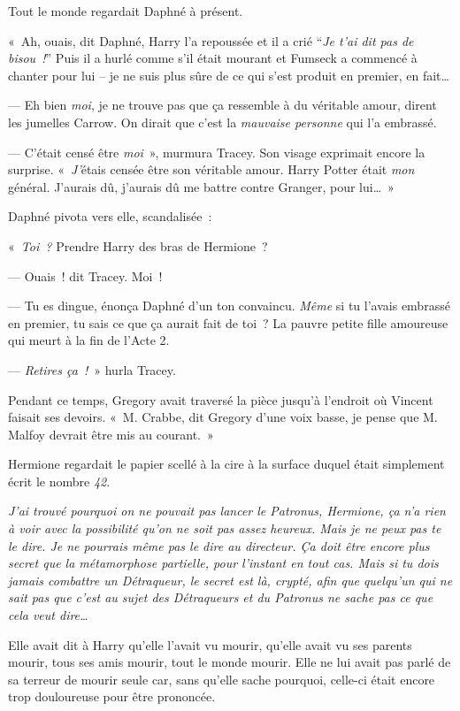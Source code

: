 Tout le monde regardait Daphné à présent.

«~Ah, ouais, dit Daphné, Harry l'a repoussée et il a crié “\emph{Je t'ai dit pas de bisou~!}” Puis il a hurlé comme s'il était mourant et Fumseck a commencé à chanter pour lui -- je ne suis plus sûre de ce qui s'est produit en premier, en fait…

--- Eh bien \emph{moi}, je ne trouve pas que ça ressemble à du véritable amour, dirent les jumelles Carrow.
On dirait que c'est la \emph{mauvaise personne} qui l'a embrassé.

--- C'était censé être \emph{moi}~», murmura Tracey.
Son visage exprimait encore la surprise.
«~\emph{J'}étais censée être son véritable amour.
Harry Potter était \emph{mon} général.
J'aurais dû, j'aurais dû me battre contre Granger, pour lui…~»

Daphné pivota vers elle, scandalisée~:

«~\emph{Toi~?} Prendre Harry des bras de Hermione~?

--- Ouais~! dit Tracey.
Moi~!

--- Tu es dingue, énonça Daphné d'un ton convaincu.
\emph{Même} si tu l'avais embrassé en premier, tu sais ce que ça aurait fait de toi~?
La pauvre petite fille amoureuse qui meurt à la fin de l'Acte 2.

--- \emph{Retires ça~!}~» hurla Tracey.

Pendant ce temps, Gregory avait traversé la pièce jusqu'à l'endroit où Vincent faisait ses devoirs.
«~M. Crabbe, dit Gregory d'une voix basse, je pense que M. Malfoy devrait être mis au courant.~»


Hermione regardait le papier scellé à la cire à la surface duquel était simplement écrit le nombre \emph{42}.

\emph{J'ai trouvé pourquoi on ne pouvait pas lancer le Patronus, Hermione, ça n'a rien à voir avec la possibilité qu'on ne soit pas assez heureux.
Mais je ne peux pas te le dire.
Je ne pourrais même pas le dire au directeur.
Ça doit être encore plus secret que la métamorphose partielle, pour l'instant en tout cas.
Mais si tu dois jamais combattre un Détraqueur, le secret est là, crypté, afin que quelqu'un qui ne sait pas que c'est au sujet des Détraqueurs et du Patronus ne sache pas ce que cela veut dire…}

Elle avait dit à Harry qu'elle l'avait vu mourir, qu'elle avait vu ses parents mourir, tous ses amis mourir, tout le monde mourir.
Elle ne lui avait pas parlé de sa terreur de mourir seule car, sans qu'elle sache pourquoi, celle-ci était encore trop douloureuse pour être prononcée.

